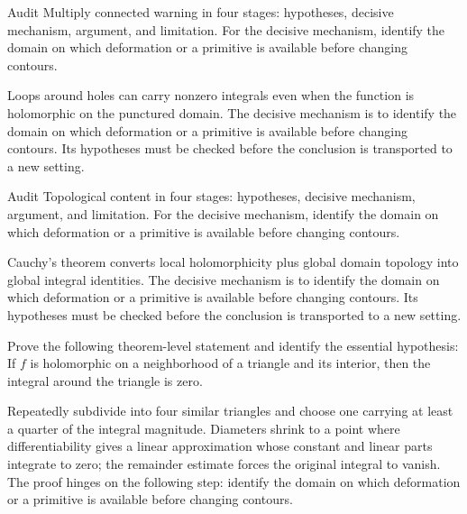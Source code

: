 \begin{problem}\label{prob:iv05-problem-07}
Audit Multiply connected warning in four stages: hypotheses, decisive mechanism, argument, and limitation. For the decisive mechanism, identify the domain on which deformation or a primitive is available before changing contours.
\end{problem}
\begin{solution}
Loops around holes can carry nonzero integrals even when the function is holomorphic on the punctured domain. The decisive mechanism is to identify the domain on which deformation or a primitive is available before changing contours. Its hypotheses must be checked before the conclusion is transported to a new setting.
\end{solution}

\begin{problem}\label{prob:iv05-problem-08}
Audit Topological content in four stages: hypotheses, decisive mechanism, argument, and limitation. For the decisive mechanism, identify the domain on which deformation or a primitive is available before changing contours.
\end{problem}
\begin{solution}
Cauchy's theorem converts local holomorphicity plus global domain topology into global integral identities. The decisive mechanism is to identify the domain on which deformation or a primitive is available before changing contours. Its hypotheses must be checked before the conclusion is transported to a new setting.
\end{solution}

\begin{problem}\label{prob:iv05-problem-09}
Prove the following theorem-level statement and identify the essential hypothesis: If $f$ is holomorphic on a neighborhood of a triangle and its interior, then the integral around the triangle is zero.
\end{problem}
\begin{solution}
Repeatedly subdivide into four similar triangles and choose one carrying at least a quarter of the integral magnitude. Diameters shrink to a point where differentiability gives a linear approximation whose constant and linear parts integrate to zero; the remainder estimate forces the original integral to vanish. The proof hinges on the following step: identify the domain on which deformation or a primitive is available before changing contours.
\end{solution}

